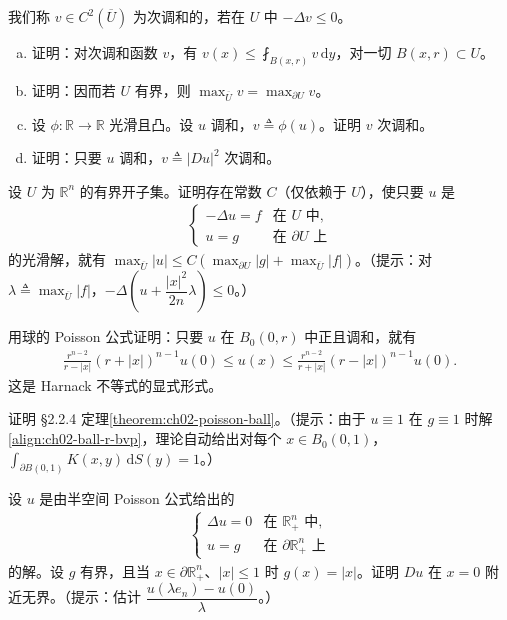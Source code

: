 \documentclass[../../main.tex]{subfiles}
\begin{document}
\begin{exercise}\label{exercise:ch02-5}
我们称 $v\in C^2(\overline{U})$ 为次调和的，若在 $U$ 中 $-\Delta v\leqslant 0$。
\begin{enumerate}[(a)]
\item 证明：对次调和函数 $v$，有 $v(x)\leqslant\fint_{B(x,r)}v\,\mathrm{d}y$，对一切 $B(x,r)\subset U$。
\item 证明：因而若 $U$ 有界，则 $\max_{\overline{U}}v=\max_{\partial U}v$。
\item 设 $\phi:\mathbb{R}\to\mathbb{R}$ 光滑且凸。设 $u$ 调和，$v\triangleq\phi(u)$。证明 $v$ 次调和。
\item 证明：只要 $u$ 调和，$v\triangleq|Du|^2$ 次调和。
\end{enumerate}
\end{exercise}

\begin{exercise}\label{exercise:ch02-6}
设 $U$ 为 $\mathbb{R}^n$ 的有界开子集。证明存在常数 $C$（仅依赖于 $U$），使只要 $u$ 是
\begin{align*}
\begin{cases}
-\Delta u=f & \text{在 }U\text{ 中},\\
u=g & \text{在 }\partial U\text{ 上}
\end{cases}
\end{align*}
的光滑解，就有 $\max_{\overline{U}}|u|\leqslant C\left(\max_{\partial U}|g|+\max_{\overline{U}}|f|\right)$。（提示：对 $\lambda\triangleq\max_{\overline{U}}|f|$，$-\Delta\left(u+\dfrac{|x|^2}{2n}\lambda\right)\leqslant 0$。）
\end{exercise}

\begin{exercise}\label{exercise:ch02-7}
用球的 Poisson 公式证明：只要 $u$ 在 $B_0(0,r)$ 中正且调和，就有
\begin{align*}
\frac{r^{n-2}}{r-|x|}(r+|x|)^{n-1}u(0)\leqslant u(x)\leqslant\frac{r^{n-2}}{r+|x|}(r-|x|)^{n-1}u(0).
\end{align*}
这是 Harnack 不等式的显式形式。
\end{exercise}

\begin{exercise}\label{exercise:ch02-8}
证明 \S2.2.4 定理\cref{theorem:ch02-poisson-ball}。（提示：由于 $u\equiv 1$ 在 $g\equiv 1$ 时解\eqref{align:ch02-ball-r-bvp}，理论自动给出对每个 $x\in B_0(0,1)$，$\int_{\partial B(0,1)}K(x,y)\,\mathrm{d}S(y)=1$。）
\end{exercise}

\begin{exercise}\label{exercise:ch02-9}
设 $u$ 是由半空间 Poisson 公式给出的
\begin{align*}
\begin{cases}
\Delta u=0 & \text{在 }\mathbb{R}^n_+\text{ 中},\\
u=g & \text{在 }\partial\mathbb{R}^n_+\text{ 上}
\end{cases}
\end{align*}
的解。设 $g$ 有界，且当 $x\in\partial\mathbb{R}^n_+$、$|x|\leqslant 1$ 时 $g(x)=|x|$。证明 $Du$ 在 $x=0$ 附近无界。（提示：估计 $\dfrac{u(\lambda e_n)-u(0)}{\lambda}$。）
\end{exercise}
\end{document}
